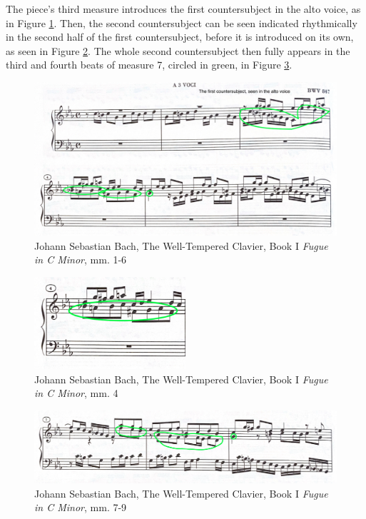 The piece's third measure introduces the first countersubject in the alto voice, as in Figure \ref{fig:bach-fugue-first-countersubject}\autocite{Henle_2009}. Then, the second countersubject can be seen indicated rhythmically in the second half of the first countersubject, before it is introduced on its own, as seen in Figure \ref{fig:bach-fugue-second-cs-indication}\autocite{Henle_2009}. The whole second countersubject then fully appears in the third and fourth beats of measure 7, circled in green, in Figure \ref{fig:bach-fugue-second-countersubject}\autocite{Henle_2009}.

\begin{figure}
    \centering
    \includegraphics[width=\textwidth]{figures/bach-fugue-first-countersubject.jpg}
    \caption{Johann Sebastian Bach, The Well-Tempered Clavier, Book I \textit{Fugue in C Minor}, mm. 1-6}
    \label{fig:bach-fugue-first-countersubject}
\end{figure}

\begin{figure}
    \centering
    \includegraphics[width=0.5\textwidth]{figures/bach-fugue-second-cs-indication.jpg}
    \caption{Johann Sebastian Bach, The Well-Tempered Clavier, Book I \textit{Fugue in C Minor}, mm. 4}
    \label{fig:bach-fugue-second-cs-indication}
\end{figure}

\begin{figure}
    \centering
    \includegraphics[width=\textwidth]{figures/bach-fugue-second-countersubject.jpg}
    \caption{Johann Sebastian Bach, The Well-Tempered Clavier, Book I \textit{Fugue in C Minor}, mm. 7-9}
    \label{fig:bach-fugue-second-countersubject}
\end{figure}

